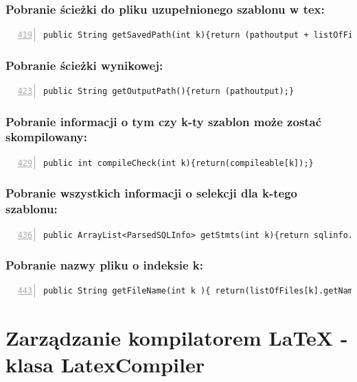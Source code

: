  \subsubsection*{Pobranie ścieżki do pliku uzupełnionego szablonu w tex:}
 \begin{lstlisting}[numbers=left,firstnumber=419]
 public String getSavedPath(int k){return (pathoutput + listOfFiles[k].getName());}
     \end{lstlisting}
     
\subsubsection*{Pobranie ścieżki wynikowej:}
 \begin{lstlisting}[numbers=left,firstnumber=423]
 public String getOutputPath(){return (pathoutput);}
     \end{lstlisting}
     
   \subsubsection*{Pobranie informacji o tym czy k-ty szablon może zostać skompilowany:}  
 \begin{lstlisting}[numbers=left,firstnumber=429]
 public int compileCheck(int k){return(compileable[k]);}
     \end{lstlisting}
 \subsubsection*{Pobranie wszystkich informacji o selekcji dla k-tego szablonu:}
 \begin{lstlisting}[numbers=left,firstnumber=436]
 public ArrayList<ParsedSQLInfo> getStmts(int k){return sqlinfo.get(k);}
     \end{lstlisting}
\subsubsection*{Pobranie nazwy pliku o indeksie k:}   
 \begin{lstlisting}[numbers=left,firstnumber=443]
 public String getFileName(int k ){ return(listOfFiles[k].getName());}
     \end{lstlisting}


\section{Zarządzanie kompilatorem LaTeX - klasa LatexCompiler}

